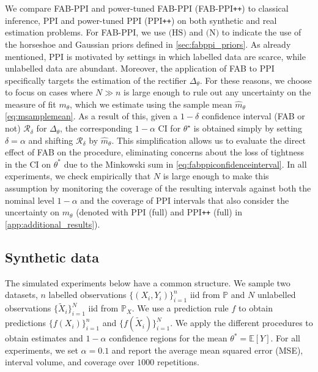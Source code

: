 We compare FAB-PPI and power-tuned FAB-PPI (FAB-PPI\texttt{++}) to classical inference, PPI and power-tuned PPI (PPI\texttt{++}) on both synthetic and real estimation problems.
For FAB-PPI, we use $\text{(HS)}$ and $\text{(N)}$ to indicate the use of the horseshoe and Gaussian priors defined in \cref{sec:fabppi_priors}.
As already mentioned, PPI is motivated by settings in which labelled data are scarce, while unlabelled data are abundant. Moreover, the application of FAB to PPI specifically targets the estimation of the rectifier $\Delta_\theta$.
For these reasons, we choose to focus on cases where $N \gg n$ is large enough to rule out any uncertainty on the measure of fit $m_\theta$, which we estimate using the sample mean $\widehat{m}_\theta$ \eqref{eq:msamplemean}. As a result of this, given a $1 - \delta$ confidence interval (FAB or not) $\mathcal{R}_\delta$ for $\Delta_\theta$, the corresponding $1 - \alpha$ CI for $\theta^\star$ is obtained simply by setting $\delta = \alpha$ and shifting $\mathcal{R}_\delta$ by $\widehat{m}_\theta$. This simplification allows us to evaluate the direct effect of FAB on the procedure, eliminating concerns about the loss of tightness in the CI on $\theta^*$ due to the Minkowski sum in \cref{eq:fabppiconfidenceinterval}. In all experiments, we check empirically that $N$ is large enough to make this assumption by monitoring the coverage of the resulting intervals against both the nominal level $1 - \alpha$ and the coverage of PPI intervals that also consider the uncertainty on $m_\theta$ (denoted with PPI (full) and PPI\texttt{++} (full) in \cref{app:additional_results}). 

\subsection{Synthetic data}\label{sec:synthetic_data}
The simulated experiments below have a common structure. We sample two datasets, $n$ labelled observations $\{(X_i,Y_i)\}_{i=1}^n$ iid from $\mathbb{P}$ and $N$ unlabelled observations $\{\widetilde{X}_i\}_{i=1}^N$ iid from $\mathbb{P}_X$. We use a prediction rule $f$ to obtain predictions $\{f(X_i)\}_{i=1}^n$ and $\{f(\widetilde{X}_i)\}_{i=1}^N$. We apply the different procedures to obtain estimates and $1 - \alpha$ confidence regions for the mean $\theta^* = \mathbb{E}[Y]$. For all experiments, we set $\alpha = 0.1$ and report the average mean squared error (MSE), interval volume, and coverage over $1000$ repetitions.

